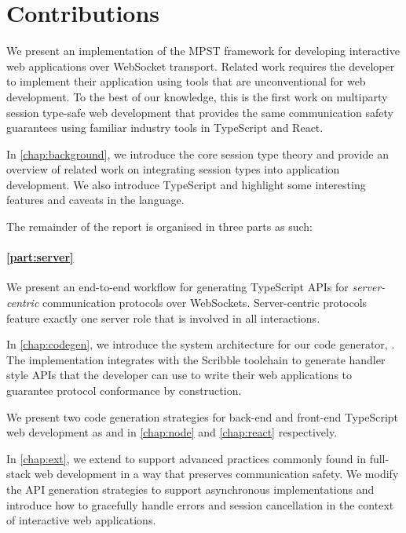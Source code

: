 \section{Contributions}

We present an implementation of the MPST framework for developing
interactive web applications over WebSocket transport. 
Related work \citep{PureScript2019, MVU2020, LINKS, Exceptional} requires the 
developer to implement their application using tools that are 
unconventional for web development.
To the best of our knowledge, this is the first work on multiparty session
type-safe web development that provides the same communication safety 
guarantees using familiar industry tools in TypeScript and React.

In \cref{chap:background}, we introduce the core session type theory
and provide an overview of related work on integrating session types into
application development. We also introduce TypeScript and highlight some 
interesting features and caveats in the language.

The remainder of the report is organised in three parts as such:

\paragraph{\cref{part:server}}
We present an end-to-end workflow for generating TypeScript APIs for 
\emph{server-centric} communication protocols over WebSockets. Server-centric 
protocols feature exactly one server role that is involved in all interactions.

In \cref{chap:codegen}, we introduce the system architecture for our
code generator, . 
The implementation integrates with the Scribble
toolchain to generate handler style APIs that the developer can use to write 
their web applications to guarantee protocol conformance by construction.

We present two code generation strategies for back-end and front-end
TypeScript web development as  and 
in \cref{chap:node} and \cref{chap:react} respectively.

In \cref{chap:ext}, we extend  to support advanced
practices commonly found in full-stack web development in a way that
preserves communication safety. We modify the API generation strategies
to support asynchronous implementations and introduce how to 
gracefully handle errors and session cancellation 
in the context of interactive web applications.

